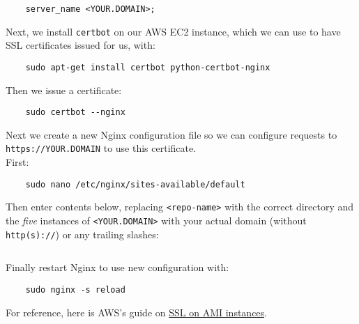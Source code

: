 \begin{verbatim}
    server_name <YOUR.DOMAIN>;
\end{verbatim}

Next, we install \texttt{certbot} on our AWS EC2 instance, which we can use to have SSL certificates issued for us, with:

\begin{verbatim}
    sudo apt-get install certbot python-certbot-nginx
\end{verbatim}

Then we issue a certificate:

\begin{verbatim}
    sudo certbot --nginx
\end{verbatim}

Next we create a new Nginx configuration file so we can configure requests to \texttt{https://YOUR.DOMAIN} to use this certificate.
\\

First:

\begin{verbatim}
    sudo nano /etc/nginx/sites-available/default
\end{verbatim}

Then enter contents below, replacing \texttt{<repo-name>} with the correct directory and the \textit{five} instances of \texttt{<YOUR.DOMAIN>} with your actual domain (without \texttt{http(s)://}) or any trailing slashes:

\inputminted{nginx}{04/resources/01/01-nginx-https.conf}

Finally restart Nginx to use new configuration with:

\begin{verbatim}
    sudo nginx -s reload
\end{verbatim}

For reference, here is AWS's guide on \href{https://docs.aws.amazon.com/AWSEC2/latest/UserGuide/SSL-on-amazon-linux-ami.html}{SSL on AMI instances}.
